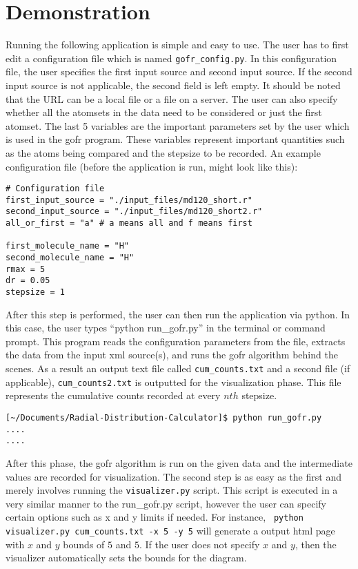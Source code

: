 \section*{Demonstration}

Running the following application is simple and easy to use. The user has to first edit a configuration file which is named \verb|gofr_config.py|. In this configuration file, the user specifies the first input source and second input source. If the second input source is not applicable, the second field is left empty. It should be noted that the URL can be a local file or a file on a server. The user can also specify whether all the atomsets in the data need to be considered or just the first atomset. The last 5 variables are the important parameters set by the user which is used in the gofr program. These variables represent important quantities such as the atoms being compared and the stepsize to be recorded. An example configuration file (before the application is run, might look like this):

\begin{verbatim}
# Configuration file
first_input_source = "./input_files/md120_short.r"
second_input_source = "./input_files/md120_short2.r"
all_or_first = "a" # a means all and f means first

first_molecule_name = "H"
second_molecule_name = "H"
rmax = 5
dr = 0.05
stepsize = 1
\end{verbatim}


After this step is performed, the user can then run the application via python. In this case, the user types ``python run\_gofr.py'' in the terminal or command prompt. This program reads the configuration parameters from the file, extracts the data from the input xml source(s), and runs the gofr algorithm behind the scenes. As a result an output text file called \verb|cum_counts.txt| and a second file (if applicable), \verb|cum_counts2.txt| is outputted for the visualization phase. This file represents the cumulative counts recorded at every $nth$ stepsize. 


\begin{verbatim}
[~/Documents/Radial-Distribution-Calculator]$ python run_gofr.py
....
....
\end{verbatim}

After this phase, the gofr algorithm is run on the given data and the intermediate values are recorded for visualization. The second step is as easy as the first and merely involves running the \verb|visualizer.py| script. This script is executed in a very similar manner to the run\_gofr.py script, however the user can specify certain options such as x and y limits if needed. For instance, \verb| python visualizer.py cum_counts.txt -x 5 -y 5| will generate a output html page with $x$ and $y$ bounds of $5$ and $5$. If the user does not specify $x$ and $y$, then the visualizer automatically sets the bounds for the diagram.


